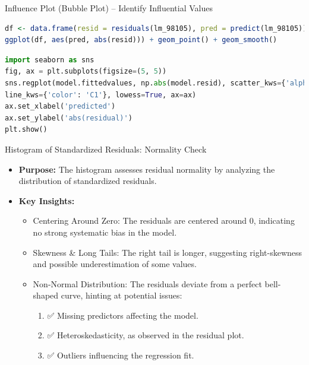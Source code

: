 \documentclass{beamer}
\begin{document}
	\begin{frame}[fragile]{Influence Plot (Bubble Plot) – Identify Influential Values}
		\begin{itemize}
		\end{itemize}
		
		\begin{lstlisting}[language=R, caption=Heteroskedasticity Plot in R]
df <- data.frame(resid = residuals(lm_98105), pred = predict(lm_98105))
ggplot(df, aes(pred, abs(resid))) + geom_point() + geom_smooth()
		\end{lstlisting}
		\begin{lstlisting}[language=Python, caption=Heteroskedasticity Plot in Python]
import seaborn as sns
fig, ax = plt.subplots(figsize=(5, 5))
sns.regplot(model.fittedvalues, np.abs(model.resid), scatter_kws={'alpha': 0.25},
line_kws={'color': 'C1'}, lowess=True, ax=ax)
ax.set_xlabel('predicted')
ax.set_ylabel('abs(residual)')
plt.show()
		\end{lstlisting}
	\end{frame}
	
	\begin{frame}{Histogram of Standardized Residuals: Normality Check}
		\begin{itemize}
			\item \textbf{Purpose:} The histogram assesses residual normality by analyzing the distribution of standardized residuals.
			\item \textbf{Key Insights:}
			\begin{itemize}
				\item Centering Around Zero: The residuals are centered around 0, indicating no strong systematic bias in the model.
				\item Skewness & Long Tails: The right tail is longer, suggesting right-skewness and possible underestimation of some values.
				
				\item Non-Normal Distribution: The residuals deviate from a perfect bell-shaped curve, hinting at potential issues:
					\begin{enumerate}
						\item 	✅ Missing predictors affecting the model.
						\item 	✅ Heteroskedasticity, as observed in the residual plot.
						\item 	✅ Outliers influencing the regression fit.
					\end{enumerate}
			\end{itemize}
		\end{itemize}
	\end{frame}
\end{document}
